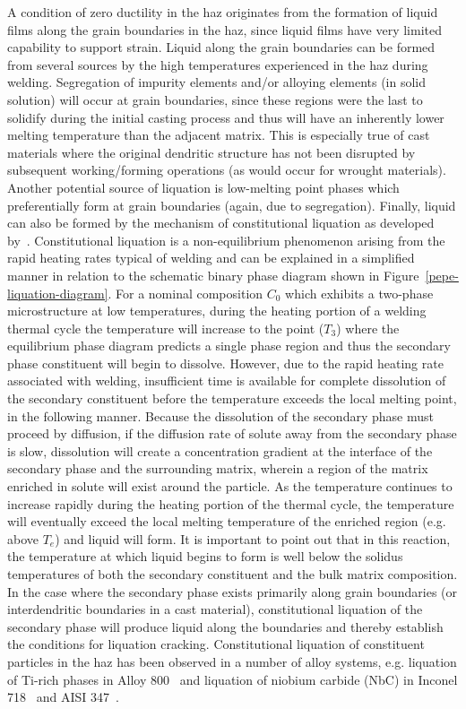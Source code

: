 A condition of zero ductility in the \gls{haz} originates from the formation of liquid films along the grain boundaries in the \gls{haz}, since liquid films have very limited capability to support strain. Liquid along the grain boundaries can be formed from several sources by the high temperatures experienced in the \gls{haz} during welding. Segregation of impurity elements and/or alloying elements (in solid solution) will occur at grain boundaries, since these regions were the last to solidify during the initial casting process and thus will have an inherently lower melting temperature than the adjacent matrix. This is especially true of cast materials where the original dendritic structure has not been disrupted by subsequent working/forming operations (as would occur for wrought materials). Another potential source of liquation is low-melting point phases which preferentially form at grain boundaries (again, due to segregation). Finally, liquid can also be formed by the mechanism of constitutional liquation as developed by~\citet{pepe_effects_1967}. Constitutional liquation is a non-equilibrium phenomenon arising from the rapid heating rates typical of welding and can be explained in a simplified manner in relation to the schematic binary phase diagram shown in Figure~\ref{pepe-liquation-diagram}. For a nominal composition $C_0$ which exhibits a two-phase microstructure at low temperatures, during the heating portion of a welding thermal cycle the temperature will increase to the point ($T_3$) where the equilibrium phase diagram predicts a single phase region and thus the secondary phase constituent will begin to dissolve. However, due to the rapid heating rate associated with welding, insufficient time is available for complete dissolution of the secondary constituent before the temperature exceeds the local melting point, in the following manner. Because the dissolution of the secondary phase must proceed by diffusion, if the diffusion rate of solute away from the secondary phase is slow, dissolution will create a concentration gradient at the interface of the secondary phase and the surrounding matrix, wherein a region of the matrix enriched in solute will exist around the particle. As the temperature continues to increase rapidly during the heating portion of the thermal cycle, the temperature will eventually exceed the local melting temperature of the enriched region (e.g. above $T_e$) and liquid will form. It is important to point out that in this reaction, the temperature at which liquid begins to form is well below the solidus temperatures of both the secondary constituent and the bulk matrix composition. In the case where the secondary phase exists primarily along grain boundaries (or interdendritic boundaries in a cast material), constitutional liquation of the secondary phase will produce liquid along the boundaries and thereby establish the conditions for liquation cracking. Constitutional liquation of constituent particles in the \gls{haz} has been observed in a number of alloy systems, e.g. liquation of Ti-rich phases in Alloy 800~\cite{lippold_investigation_1983} and liquation of niobium carbide (NbC) in Inconel 718~\cite{radhakrishnan_phase_1991} and AISI 347~\cite{lee_weldability_1988}.

